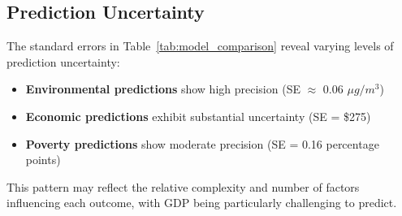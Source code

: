 \subsection{Prediction Uncertainty}

The standard errors in Table~\ref{tab:model_comparison} reveal varying levels of prediction uncertainty:

\begin{itemize}
    \item \textbf{Environmental predictions} show high precision (SE $\approx$ 0.06 $\mu g/m^3$)
    \item \textbf{Economic predictions} exhibit substantial uncertainty (SE = \$275)
    \item \textbf{Poverty predictions} show moderate precision (SE = 0.16 percentage points)
\end{itemize}

This pattern may reflect the relative complexity and number of factors influencing each outcome, with GDP being particularly challenging to predict.
